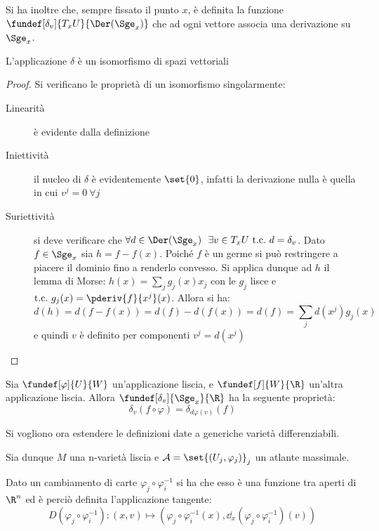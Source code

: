 Si ha inoltre che, sempre fissato il punto $x$, è definita la funzione $\fundef[\delta_v]{T_x U}{\Der(\Sge_x)}$ che ad ogni vettore associa una derivazione su $\Sge_x$.

\begin{lemma}
L'applicazione $\delta$ è un isomorfismo di spazi vettoriali
\end{lemma}
\begin{proof}
Si verificano le proprietà di un isomorfismo singolarmente:
\begin{description}
\item[Linearità] è evidente dalla definizione
\item[Iniettività] il nucleo di $\delta$ è evidentemente $\set{0}$, infatti la derivazione nulla è quella in cui $v^j = 0~ \forall j$
\item[Suriettività] si deve verificare che $\forall d\in \Der(\Sge_x)\ \ \exists v\in T_x U\ \text{t.c.}\ d = \delta_v$. Dato $f\in \Sge_x$ sia $h = f -f(x)$. Poiché $f$ è un germe si può restringere a piacere il dominio fino a renderlo convesso. Si applica dunque ad $h$ il lemma di Morse: $h(x) = \sum_j g_j(x)x_j$ con le $g_j$ lisce e $\text{t.c.}\ g_j(x) = \pderiv{f}{x^j}(x)$. Allora si ha:
\begin{equation*}
d(h) = d(f - f(x)) = d(f) - d(f(x)) = d(f) = \sum_jd(x^j)g_j(x) 
\end{equation*}
e quindi $v$ è definito per componenti $v^j = d(x^j)$
\end{description}
\end{proof}

\begin{oss}
Sia $\fundef[\varphi]{U}{W}$ un'applicazione liscia, e $\fundef[f]{W}{\R}$ un'altra applicazione liscia. Allora $\fundef[\delta_v]{\Sge_x}{\R}$ ha la seguente proprietà:
\begin{equation*}
\delta_v(f\circ \varphi) = \delta_{d\varphi (v)}(f)
\end{equation*}
\end{oss}


Si vogliono ora estendere le definizioni date a generiche varietà differenziabili.

Sia dunque $M$ una n-varietà liscia e $\mathcal{A} = \set{(U_j, \varphi _j)}_j$ un atlante massimale.

\begin{oss}
Dato un cambiamento di carte $\varphi _j \circ \varphi _i ^{-1}$ si ha che esso è una funzione tra aperti di $\R ^n$ ed è perciò definita l'applicazione tangente:
\begin{equation*}
D(\varphi _j \circ \varphi _i ^{-1}): (x,v) \mapsto (\varphi _j \circ \varphi _i ^{-1}(x), \dd_x(\varphi _j \circ \varphi _i ^{-1})(v))
\end{equation*}
\end{oss}

